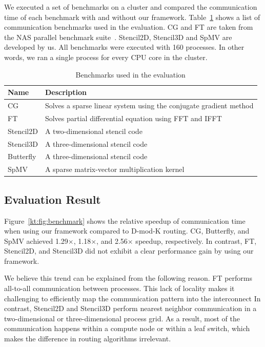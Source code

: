 \documentclass[graybox]{svmult}
\begin{document}
We executed a set of benchmarks on a cluster and compared the communication
time of each benchmark with and without our framework.
Table~\ref{kt:tbl:miniapps} shows a list of communication benchmarks used in
the evaluation. CG and FT are taken from the NAS parallel benchmark
suite~\cite{Bailey1991}. Stencil2D, Stencil3D and SpMV are developed by us.
All benchmarks were executed with 160 processes. In other words, we ran a
single process for every CPU core in the cluster.

\begin{table}
\caption{Benchmarks used in the evaluation}%
\label{kt:tbl:miniapps}
\begin{tabular}{ll}
\toprule
Name      & Description \\ \midrule
CG        & Solves a sparse linear system using the conjugate gradient method \\
FT        & Solves partial differential equation using FFT and IFFT           \\
Stencil2D & A two-dimensional stencil code                                    \\
Stencil3D & A three-dimensional stencil code                                  \\
Butterfly & A three-dimensional stencil code                                  \\
SpMV      & A sparse matrix-vector multiplication kernel                      \\ \bottomrule
\end{tabular}
\end{table}

\subsection{Evaluation Result}

Figure~\ref{kt:fig:benchmark} shows the relative speedup of communication time
when using our framework compared to D-mod-K routing. CG, Butterfly, and SpMV
achieved 1.29$\times$, 1.18$\times$, and 2.56$\times$ speedup, respectively.
In contrast, FT, Stencil2D, and Stencil3D did not exhibit a clear performance
gain by using our framework.

We believe this trend can be explained from the following reason. FT performs
all-to-all communication between processes. This lack of locality makes it
challenging to efficiently map the communication pattern into the interconnect
In contrast, Stencil2D and Stencil3D perform nearest neighbor communication in
a two-dimensional or three-dimensional process grid. As a result, most of the
communication happens within a compute node or within a leaf switch, which
makes the difference in routing algorithms irrelevant.
\end{document}
